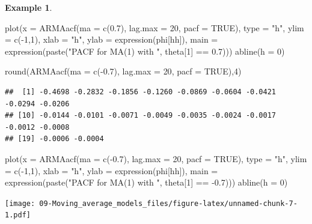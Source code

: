 \documentclass[
]{book}
\newenvironment{Shaded}{\begin{snugshade}}{\end{snugshade}}
\newcommand{\AttributeTok}[1]{\textcolor[rgb]{0.77,0.63,0.00}{#1}}
\newcommand{\ConstantTok}[1]{\textcolor[rgb]{0.00,0.00,0.00}{#1}}
\newcommand{\DecValTok}[1]{\textcolor[rgb]{0.00,0.00,0.81}{#1}}
\newcommand{\FloatTok}[1]{\textcolor[rgb]{0.00,0.00,0.81}{#1}}
\newcommand{\FunctionTok}[1]{\textcolor[rgb]{0.00,0.00,0.00}{#1}}
\newcommand{\NormalTok}[1]{#1}
\newcommand{\SpecialCharTok}[1]{\textcolor[rgb]{0.00,0.00,0.00}{#1}}
\newcommand{\StringTok}[1]{\textcolor[rgb]{0.31,0.60,0.02}{#1}}
\theoremstyle{definition}
\theoremstyle{definition}
\newtheorem{example}{Example}[chapter]
\theoremstyle{definition}
\theoremstyle{definition}
\theoremstyle{remark}
\begin{document}
\begin{example}
\begin{Shaded}
\begin{Highlighting}[]
\FunctionTok{plot}\NormalTok{(}\AttributeTok{x =} \FunctionTok{ARMAacf}\NormalTok{(}\AttributeTok{ma =} \FunctionTok{c}\NormalTok{(}\FloatTok{0.7}\NormalTok{), }\AttributeTok{lag.max =} \DecValTok{20}\NormalTok{, }\AttributeTok{pacf =} \ConstantTok{TRUE}\NormalTok{), }\AttributeTok{type =} \StringTok{"h"}\NormalTok{, }\AttributeTok{ylim =} \FunctionTok{c}\NormalTok{(}\SpecialCharTok{{-}}\DecValTok{1}\NormalTok{,}\DecValTok{1}\NormalTok{), }\AttributeTok{xlab =} \StringTok{"h"}\NormalTok{, }\AttributeTok{ylab =} \FunctionTok{expression}\NormalTok{(phi[hh]),}
       \AttributeTok{main =} \FunctionTok{expression}\NormalTok{(}\FunctionTok{paste}\NormalTok{(}\StringTok{"PACF for MA(1) with "}\NormalTok{, theta[}\DecValTok{1}\NormalTok{] }\SpecialCharTok{==} \FloatTok{0.7}\NormalTok{)))}
\FunctionTok{abline}\NormalTok{(}\AttributeTok{h =} \DecValTok{0}\NormalTok{)}

\FunctionTok{round}\NormalTok{(}\FunctionTok{ARMAacf}\NormalTok{(}\AttributeTok{ma =} \FunctionTok{c}\NormalTok{(}\SpecialCharTok{{-}}\FloatTok{0.7}\NormalTok{), }\AttributeTok{lag.max =} \DecValTok{20}\NormalTok{, }\AttributeTok{pacf =} \ConstantTok{TRUE}\NormalTok{),}\DecValTok{4}\NormalTok{) }
\end{Highlighting}
\end{Shaded}

\begin{verbatim}
##  [1] -0.4698 -0.2832 -0.1856 -0.1260 -0.0869 -0.0604 -0.0421 -0.0294 -0.0206
## [10] -0.0144 -0.0101 -0.0071 -0.0049 -0.0035 -0.0024 -0.0017 -0.0012 -0.0008
## [19] -0.0006 -0.0004
\end{verbatim}

\begin{Shaded}
\begin{Highlighting}[]
\FunctionTok{plot}\NormalTok{(}\AttributeTok{x =} \FunctionTok{ARMAacf}\NormalTok{(}\AttributeTok{ma =} \FunctionTok{c}\NormalTok{(}\SpecialCharTok{{-}}\FloatTok{0.7}\NormalTok{), }\AttributeTok{lag.max =} \DecValTok{20}\NormalTok{, }\AttributeTok{pacf =} \ConstantTok{TRUE}\NormalTok{), }\AttributeTok{type =} \StringTok{"h"}\NormalTok{, }\AttributeTok{ylim =} \FunctionTok{c}\NormalTok{(}\SpecialCharTok{{-}}\DecValTok{1}\NormalTok{,}\DecValTok{1}\NormalTok{), }\AttributeTok{xlab =} \StringTok{"h"}\NormalTok{, }\AttributeTok{ylab =} \FunctionTok{expression}\NormalTok{(phi[hh]),}
       \AttributeTok{main =} \FunctionTok{expression}\NormalTok{(}\FunctionTok{paste}\NormalTok{(}\StringTok{"PACF for MA(1) with "}\NormalTok{, theta[}\DecValTok{1}\NormalTok{] }\SpecialCharTok{==} \SpecialCharTok{{-}}\FloatTok{0.7}\NormalTok{)))}
\FunctionTok{abline}\NormalTok{(}\AttributeTok{h =} \DecValTok{0}\NormalTok{)}
\end{Highlighting}
\end{Shaded}

\texttt{[image: 09-Moving\_average\_models\_files/figure-latex/unnamed-chunk-7-1.pdf]}
\end{example}
\end{document}
